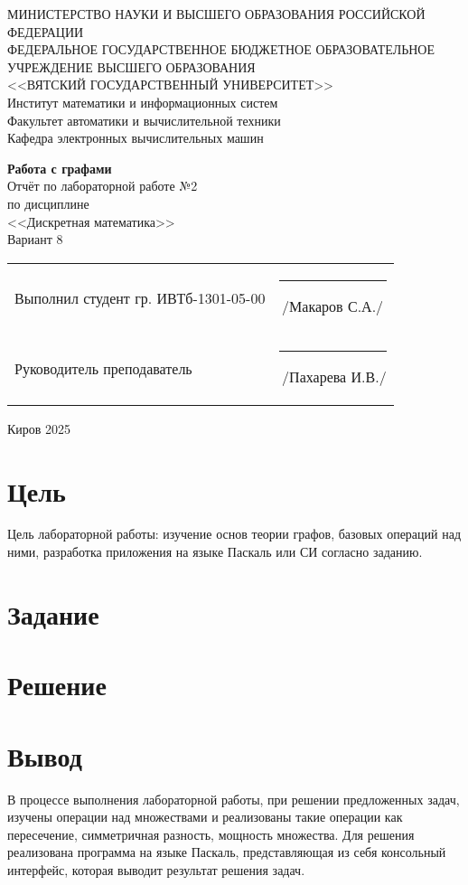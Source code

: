 \documentclass[a4paper,14pt]{extarticle}
\begin{document}
	\newpage\thispagestyle{empty}
	\begin{center}
		\MakeUppercase{
			Министерство науки и высшего образования Российской Федерации\\
			Федеральное государственное бюджетное образовательное учреждение высшего образования\\
			<<Вятский Государственный Университет>>\\
		}
		Институт математики и информационных систем\\
		Факультет автоматики и вычислительной техники\\
		Кафедра электронных вычислительных машин
	\end{center}
	\vfill
	
	\begin{center}
		\textbf{Работа с графами}\\
		Отчёт по лабораторной работе №2\\
		по дисциплине\\
		<<Дискретная математика>>\\
		Вариант 8
	\end{center}
	\vfill
	
	\noindent
	\begin{tabular}{ll}
		Выполнил студент гр. ИВТб-1301-05-00 \hspace{5mm} &
		\rule[-1mm]{25mm}{0.10mm}\,/Макаров С.А./\\
		
		Руководитель преподаватель & \rule[-1mm]{25mm}{0.10mm}\,/Пахарева И.В./\\
	\end{tabular}
	
	\vfill
	\begin{center}
		Киров 2025
	\end{center}
	
	\newpage
	\section*{Цель}
	Цель лабораторной работы: изучение основ теории графов, базовых операций над ними, разработка приложения на языке Паскаль или СИ согласно заданию.
	
	\section*{Задание}
	
	
	\section*{Решение}
	
	\section*{Вывод}
	В процессе выполнения лабораторной работы, при решении предложенных задач, изучены операции над множествами и реализованы такие операции как пересечение, симметричная разность, мощность множества. Для решения реализована программа на языке Паскаль, представляющая из себя консольный интерфейс, которая выводит результат решения задач.
\end{document}
